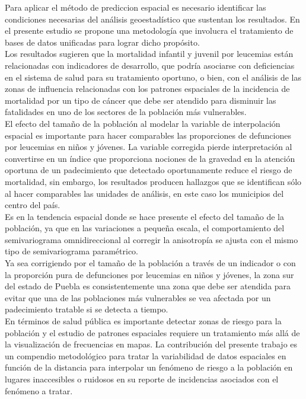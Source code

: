 \documentclass[11pt, oneside]{book}
\begin{document}
Para aplicar el método de prediccion espacial es necesario identificar las condiciones necesarias del análisis geoestadístico que sustentan los resultados. En el presente estudio se propone una metodología que involucra el tratamiento de bases de datos unificadas para lograr dicho propósito.\\

Los resultados sugieren que la mortalidad infantil y juvenil por leucemias están relacionadas con indicadores de desarrollo, que podría asociarse con deficiencias en el sistema de salud para su tratamiento oportuno, o bien, con el análisis de las zonas de influencia relacionadas con los patrones espaciales de la incidencia de mortalidad por un tipo de cáncer que debe ser atendido para disminuir las fatalidades en uno de los sectores de la población más vulnerables.\\

El efecto del tamaño de la población al modelar la variable de interpolación espacial es importante para hacer comparables las proporciones de defunciones por leucemias en niños y jóvenes. La variable corregida pierde interpretación al convertirse en un índice que proporciona nociones de la gravedad en la atención oportuna de un padecimiento que detectado oportunamente reduce el riesgo de mortalidad, sin embargo, los resultados producen hallazgos que se identifican sólo al hacer comparables las unidades de análisis, en este caso los municipios del centro del país.\\ 

Es en la tendencia espacial donde se hace presente el efecto del tamaño de la población, ya que en las variaciones a pequeña escala, el comportamiento del semivariograma omnidireccional al corregir la anisotropía se ajusta con el mismo tipo de semivariograma paramétrico.\\

Ya sea corrigiendo por el tamaño de la población a través de un indicador o con la proporción pura de defunciones por leucemias en niños y jóvenes, la zona sur del estado de Puebla es consistentemente una zona que debe ser atendida para evitar que una de las poblaciones más vulnerables se vea afectada por un padecimiento tratable si se detecta a tiempo.\\

En términos de salud pública es importante detectar zonas de riesgo para la población y el estudio de patrones espaciales requiere un tratamiento más allá de la visualización de frecuencias en mapas. La contribución del presente trabajo es un compendio metodológico para tratar la variabilidad de datos espaciales en función de la distancia para interpolar un fenómeno de riesgo a la población en lugares inaccesibles o ruidosos en su reporte de incidencias asociados con el fenómeno a tratar.\\
\end{document}
